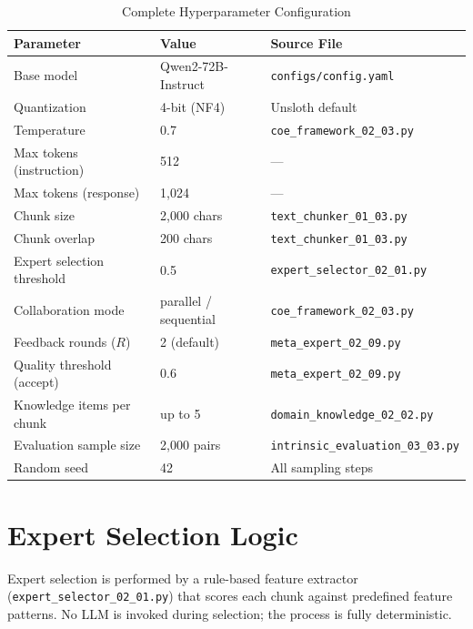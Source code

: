 \documentclass[sigconf,nonacm]{acmart}
\begin{document}
\begin{table}[h]
\centering
\caption{Complete Hyperparameter Configuration}
\label{tab:hyperparameters}
\small
\begin{tabular}{@{}p{4cm}p{3cm}p{4.5cm}@{}}
\toprule
\textbf{Parameter} & \textbf{Value} & \textbf{Source File} \\
\midrule
Base model & Qwen2-72B-Instruct & \texttt{configs/config.yaml} \\
Quantization & 4-bit (NF4) & Unsloth default \\
Temperature & 0.7 & \texttt{coe\_framework\_02\_03.py} \\
Max tokens (instruction) & 512 & --- \\
Max tokens (response) & 1,024 & --- \\
Chunk size & 2,000 chars & \texttt{text\_chunker\_01\_03.py} \\
Chunk overlap & 200 chars & \texttt{text\_chunker\_01\_03.py} \\
Expert selection threshold & 0.5 & \texttt{expert\_selector\_02\_01.py} \\
Collaboration mode & parallel / sequential & \texttt{coe\_framework\_02\_03.py} \\
Feedback rounds ($R$) & 2 (default) & \texttt{meta\_expert\_02\_09.py} \\
Quality threshold (accept) & 0.6 & \texttt{meta\_expert\_02\_09.py} \\
Knowledge items per chunk & up to 5 & \texttt{domain\_knowledge\_02\_02.py} \\
Evaluation sample size & 2,000 pairs & \texttt{intrinsic\_evaluation\_03\_03.py} \\
Random seed & 42 & All sampling steps \\
\bottomrule
\end{tabular}
\end{table}

\section{Expert Selection Logic}

Expert selection is performed by a rule-based feature extractor (\texttt{expert\_selector\_02\_01.py}) that scores each chunk against predefined feature patterns. No LLM is invoked during selection; the process is fully deterministic.
\end{document}
